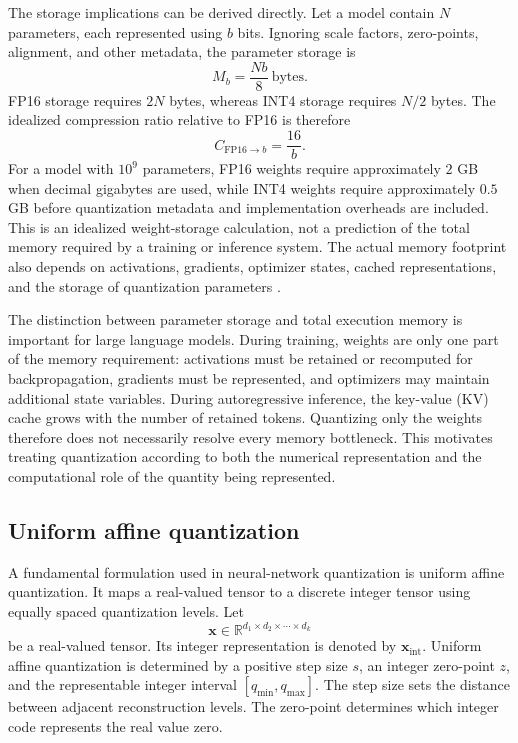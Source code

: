 The storage implications can be derived directly. Let a model contain
\(N\) parameters, each represented using \(b\) bits. Ignoring scale
factors, zero-points, alignment, and other metadata, the parameter
storage is
\begin{equation}
    M_b=\frac{Nb}{8}\ \text{bytes}.
    \label{eq:quant-model-memory}
\end{equation}
FP16 storage requires \(2N\) bytes, whereas INT4 storage requires
\(N/2\) bytes. The idealized compression ratio relative to FP16 is
therefore
\begin{equation}
    C_{\mathrm{FP16}\rightarrow b}
    =
    \frac{16}{b}.
    \label{eq:quant-compression-ratio}
\end{equation}
For a model with \(10^9\) parameters, FP16 weights require approximately
\(2\) GB when decimal gigabytes are used, while INT4 weights require
approximately \(0.5\) GB before quantization metadata and implementation
overheads are included. This is an idealized weight-storage calculation,
not a prediction of the total memory required by a training or inference
system. The actual memory footprint also depends on activations,
gradients, optimizer states, cached representations, and the storage of
quantization parameters \parencite{chen2026llmquantization}.

The distinction between parameter storage and total execution memory is
important for large language models. During training, weights are only
one part of the memory requirement: activations must be retained or
recomputed for backpropagation, gradients must be represented, and
optimizers may maintain additional state variables. During autoregressive
inference, the key-value (KV) cache grows with the number of retained
tokens. Quantizing only the weights therefore does not necessarily
resolve every memory bottleneck. This motivates treating quantization
according to both the numerical representation and the computational
role of the quantity being represented.

\subsection{Uniform affine quantization}
\label{subsec:quant-uniform-affine}

A fundamental formulation used in neural-network quantization is uniform
affine quantization. It maps a real-valued tensor to a discrete integer
tensor using equally spaced quantization levels. Let
\begin{equation}
    \mathbf{x}\in
    \mathbb{R}^{d_1\times d_2\times\cdots\times d_k}
    \label{eq:quant-real-tensor}
\end{equation}
be a real-valued tensor. Its integer representation is denoted by
\(\mathbf{x}_{\mathrm{int}}\). Uniform affine quantization is determined
by a positive step size \(s\), an integer zero-point \(z\), and the
representable integer interval \([q_{\min},q_{\max}]\). The step size
sets the distance between adjacent reconstruction levels. The
zero-point determines which integer code represents the real value zero.

